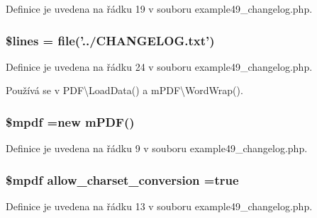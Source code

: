 Definice je uvedena na řádku 19 v souboru example49\-\_\-changelog.\-php.

\hypertarget{example49__changelog_8php_a470f99c17f2e6f0a5a7b96f44cfc46a5}{
\subsubsection[{\$lines}]{\setlength{\rightskip}{0pt plus 5cm}\$lines = file('../C\-H\-A\-N\-G\-E\-L\-O\-G.\-txt')}}\label{example49__changelog_8php_a470f99c17f2e6f0a5a7b96f44cfc46a5}


Definice je uvedena na řádku 24 v souboru example49\-\_\-changelog.\-php.



Používá se v P\-D\-F\textbackslash{}\-Load\-Data() a m\-P\-D\-F\textbackslash{}\-Word\-Wrap().

\hypertarget{example49__changelog_8php_ad028f81910d6cbab9b184d2214b3a8f8}{
\subsubsection[{\$mpdf}]{\setlength{\rightskip}{0pt plus 5cm}\$mpdf =new {\bf m\-P\-D\-F}()}}\label{example49__changelog_8php_ad028f81910d6cbab9b184d2214b3a8f8}


Definice je uvedena na řádku 9 v souboru example49\-\_\-changelog.\-php.

\hypertarget{example49__changelog_8php_abef25a78e171b6e37513665f692d1960}{
\subsubsection[{allow\-\_\-charset\-\_\-conversion}]{\setlength{\rightskip}{0pt plus 5cm}\$mpdf allow\-\_\-charset\-\_\-conversion =true}}\label{example49__changelog_8php_abef25a78e171b6e37513665f692d1960}


Definice je uvedena na řádku 13 v souboru example49\-\_\-changelog.\-php.

